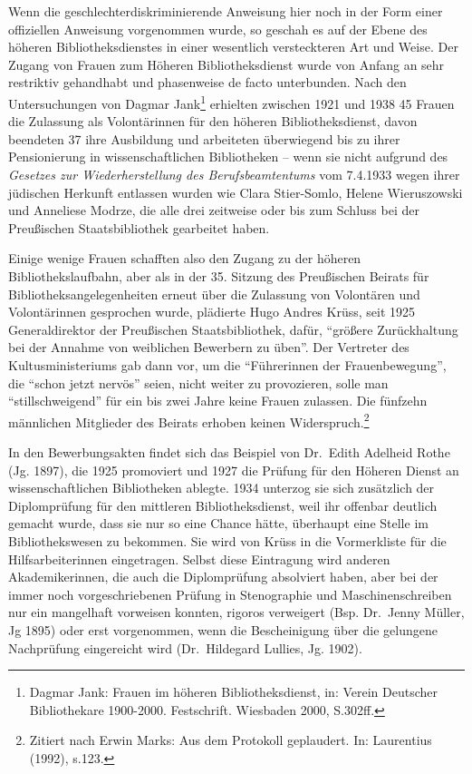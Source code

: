 \documentclass[a4paper,
fontsize=11pt,
oneside,
numbers=noperiodatend,
parskip=half-,
bibliography=totoc,
final
]{scrartcl}
\begin{document}
Wenn die geschlechterdiskriminierende Anweisung hier noch in der Form
einer offiziellen Anweisung vorgenommen wurde, so geschah es auf der
Ebene des höheren Bibliotheksdienstes in einer wesentlich versteckteren
Art und Weise. Der Zugang von Frauen zum Höheren Bibliotheksdienst wurde
von Anfang an sehr restriktiv gehandhabt und phasenweise de facto
unterbunden. Nach den Untersuchungen von Dagmar Jank\footnote{Dagmar
  Jank: Frauen im höheren Bibliotheksdienst, in: Verein Deutscher
  Bibliothekare 1900-2000. Festschrift. Wiesbaden 2000, S.302ff.}
erhielten zwischen 1921 und 1938 45 Frauen die Zulassung als
Volontärinnen für den höheren Bibliotheksdienst, davon beendeten 37 ihre
Ausbildung und arbeiteten überwiegend bis zu ihrer Pensionierung in
wissenschaftlichen Bibliotheken -- wenn sie nicht aufgrund des
\emph{Gesetzes zur Wiederherstellung des Berufsbeamtentums} vom 7.4.1933
wegen ihrer jüdischen Herkunft entlassen wurden wie Clara Stier-Somlo,
Helene Wieruszowski und Anneliese Modrze, die alle drei zeitweise oder
bis zum Schluss bei der Preußischen Staatsbibliothek gearbeitet haben.

Einige wenige Frauen schafften also den Zugang zu der höheren
Bibliothekslaufbahn, aber als in der 35. Sitzung des Preußischen Beirats
für Bibliotheksangelegenheiten erneut über die Zulassung von Volontären
und Volontärinnen gesprochen wurde, plädierte Hugo Andres Krüss, seit
1925 Generaldirektor der Preußischen Staatsbibliothek, dafür,
\enquote{größere Zurückhaltung bei der Annahme von weiblichen Bewerbern
zu üben}. Der Vertreter des Kultusministeriums gab dann vor, um die
\enquote{Führerinnen der Frauenbewegung}, die \enquote{schon jetzt
nervös} seien, nicht weiter zu provozieren, solle man
\enquote{stillschweigend} für ein bis zwei Jahre keine Frauen zulassen.
Die fünfzehn männlichen Mitglieder des Beirats erhoben keinen
Widerspruch.\footnote{Zitiert nach Erwin Marks: Aus dem Protokoll
  geplaudert. In: Laurentius (1992), s.123.}

In den Bewerbungsakten findet sich das Beispiel von Dr.~Edith Adelheid
Rothe (Jg. 1897), die 1925 promoviert und 1927 die Prüfung für den
Höheren Dienst an wissenschaftlichen Bibliotheken ablegte. 1934 unterzog
sie sich zusätzlich der Diplomprüfung für den mittleren
Bibliotheksdienst, weil ihr offenbar deutlich gemacht wurde, dass sie
nur so eine Chance hätte, überhaupt eine Stelle im Bibliothekswesen zu
bekommen. Sie wird von Krüss in die Vormerkliste für die
Hilfsarbeiterinnen eingetragen. Selbst diese Eintragung wird anderen
Akademikerinnen, die auch die Diplomprüfung absolviert haben, aber bei
der immer noch vorgeschriebenen Prüfung in Stenographie und
Maschinenschreiben nur ein mangelhaft vorweisen konnten, rigoros
verweigert (Bsp. Dr.~Jenny Müller, Jg 1895) oder erst vorgenommen, wenn
die Bescheinigung über die gelungene Nachprüfung eingereicht wird
(Dr.~Hildegard Lullies, Jg. 1902).
\end{document}
